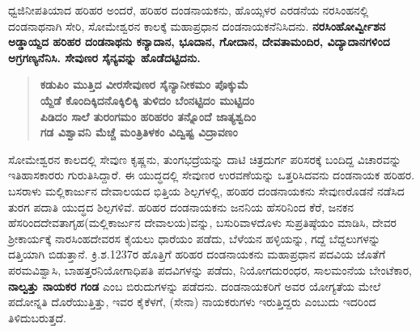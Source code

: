 ಧ್ವಜಿನೀಪತಿಯಾದ ಹರಿಹರ ಅಂದರೆ, ಹರಿಹರ ದಂಡನಾಯಕನು, ಹೊಯ್ಸಳರ ಎರಡನೆಯ ನರಸಿಂಹನಲ್ಲಿ ದಂಡನಾಥ\-ನಾಗಿ ಸೇರಿ, ಸೋಮೇಶ್ವರನ ಕಾಲಕ್ಕೆ ಮಹಾಪ್ರಧಾನ ದಂಡನಾಯಕನೆನಿಸಿದನು. \textbf{ನರಸಿಂಹೋರ್ವ್ವೀಶನ ಅಡ್ಡಾಯ್ದದ ಹರಿಹರ ದಂಡನಾಥನು ಕನ್ಯಾದಾನ, ಭೂದಾನ, ಗೋದಾನ, ದೇವತಾಮಂದಿರ, ವಿದ್ಯಾದಾನಗಳಿಂದ ಅಗ್ರಗಣ್ಯನೆನಿಸಿ. ಸೇವುಣರ ಸೈನ್ಯವನ್ನು ಹೊಡೆದಟ್ಟಿದನು. }

\begin{verse}
\textbf{ಕಡುಪಿಂ ಮುತ್ತಿದ ವೀರಸೇವುಣರ ಸೈನ್ಯಾನೀಕಮಂ ಪೊಕ್ಕುಮೆ} \\\textbf{ಯ್ದೆಡೆ ಕೊಂದಿಕ್ಕಿದನೊಕ್ಕಿಲಿಕ್ಕಿ ತುಳಿದಂ ಬೆಂನಟ್ಟಿದಂ ಮುಟ್ಟಿದಂ} \\\textbf{ಪಿಡಿದಂ ಸಾಲೆ ತುರಂಗಮಂ ಹರಿಹರಂ ತನ್ನೊಂದೆ ಜಾತ್ಯಶ್ವದಿಂ} \\\textbf{ಗಡ ವಿಶ್ವಾವನಿ ಮೆಚ್ಚೆ ಮಂತ್ರಿತಿಳಕಂ ವಿದ್ವಿಷ್ಟ ವಿದ್ರಾವಣಂ }
\end{verse}

ಸೋಮೇಶ್ವರನ ಕಾಲದಲ್ಲಿ ಸೇವುಣ ಕೃಷ್ಣನು, ತುಂಗಭದ್ರೆಯನ್ನು ದಾಟಿ ಚಿತ್ರದುರ್ಗ ಪರಿಸರಕ್ಕೆ ಬಂದಿದ್ದ ವಿಚಾರವನ್ನು ಇತಿಹಾಸಕಾರರು ಗುರುತಿಸಿದ್ದಾರೆ. ಈ ಯುದ್ಧದಲ್ಲಿ ಸೇವುಣರ ಉರವಣೆಯನ್ನು ಒತ್ತರಿಸಿದವನು ದಂಡನಾಯಕ ಹರಿಹರ. ಬಸರಾಳು ಮಲ್ಲಿಕಾರ್ಜುನ ದೇವಾಲಯದ ಭಿತ್ತಿಯ ಶಿಲ್ಪಗಳಲ್ಲಿ, ಹರಿಹರ ದಂಡನಾಯಕನು ಸೇವುಣರೊಡನೆ ನಡೆಸಿದ ತುರಗ ಪದಾತಿ ಯುದ್ಧದ ಶಿಲ್ಪಗಳಿವೆ. ಹರಿಹರ ದಂಡನಾಯಕನು ಜನನಿಯ ಹೆಸರಿನಿಂದ ಕೆರೆ, ಜನಕನ ಹೆಸರಿಂದ\break ದೇವತಾಗೃಹ(ಮಲ್ಲಿಕಾರ್ಜುನ ದೇವಾಲಯ)ವನ್ನು, ಬಸುರಿವಾಳದೊಳು ಸುಪ್ರತಿಷ್ಠೆಯಂ ಮಾಡಿಸಿ, ದೇವರ ಶ‍್ರೀಕಾರ್ಯಕ್ಕೆ ನಾರಸಿಂಹದೇವರಸ ಕೈಯಲು ಧಾರೆಯಂ ಪಡೆದು, ಬೆಳೆಯನ ಹಳ್ಳಿಯನ್ನು, ಗದ್ದೆ ಬೆದ್ದಲುಗಳನ್ನು ದತ್ತಿಯಾಗಿ ಬಿಡುತ್ತಾನೆ. ಕ್ರಿ.ಶ.1237ರ ಹೊತ್ತಿಗೆ ಹರಿಹರ ದಂಡನಾಯಕನು ಮಹಾಪ್ರಧಾನ ಪದವಿಯ ಜೊತೆಗೆ ಪರಮವಿಶ್ವಾಸಿ, ಬಾಹತ್ತರ\break ನಿಯೋಗಾಧಿಪತಿ ಪದವಿಗಳನ್ನು ಪಡೆದು, ನಿಯೋಗದುರಂಧರ, ಸಾಲಮಂನೆಯ ಬೇಂಟೆಕಾರ, \textbf{ನಾಲ್ವತ್ತು ನಾಯಕರ ಗಂಡ} ಎಂಬ ಬಿರುದುಗಳನ್ನು ಪಡೆದನು. ದಂಡನಾಯಕರಿಗೆ ಅವರ ಯೋಗ್ಯತೆಯ ಮೇಲೆ ಪದೋನ್ನತಿ ದೊರೆಯುತ್ತಿತ್ತು, ಇವರ ಕೈಕೆಳಗೆ, (ಸೇನಾ) ನಾಯಕರುಗಳು ಇರುತ್ತಿದ್ದರು ಎಂಬುದು ಇದರಿಂದ ತಿಳಿದುಬರುತ್ತದೆ.

